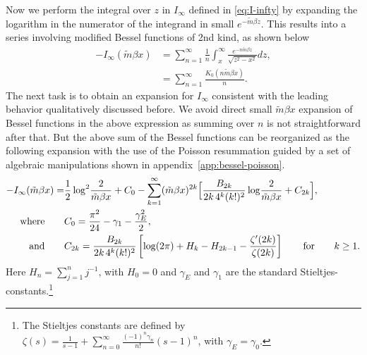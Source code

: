 \documentclass[a4paper,11pt]{article}
\newcommand{\appref}[1]{appendix~\ref{#1}}
\newcommand{\e}{\mathrm e}
\newcommand{\dd}{\mathrm d}
\begin{document}
Now we perform the integral over $z$ in $I_\infty$ defined in \eqref{eq:I-infty} by expanding the logarithm in the numerator of the integrand in small $e^{-\tilde m \beta z}$. This results into a series involving modified Bessel functions of 2nd kind, as shown below 
\begin{align}
	-I_\infty(\tilde m\beta x)
	&=\sum_{n=1}^{\infty} \frac{1}{n} \int_x^\infty \frac{e^{-n\tilde m  \beta z}}{\sqrt{z^2-x^2}} dz
	\nonumber,\\
	&=
	\sum_{n=1}^{\infty}
	\frac{K_0(n\tilde m\beta x)}{n}.
	\label{eq:BP-bessel-sum}
\end{align}
The next task is to obtain an expansion for $I_\infty$ consistent with the leading behavior qualitatively  discussed before.
We avoid direct small $\tilde m \beta x$ expansion of  Bessel functions in the above expression as summing over $n$ is not straightforward after that. But the above sum of the Bessel functions can be reorganized as the following expansion with the use of the Poisson resummation guided by a set of algebraic manipulations shown in \appref{app:bessel-poisson}.
%
%
\begin{align}
	-I_\infty(\tilde m\beta x)=&
 \frac12\log^2\!\frac2{\tilde m\beta x}+C_0
-\sum_{k=1}^{\infty}(\tilde m\beta x)^{2k}
 \Big[
 \frac{B_{2k}}{2k\,4^k(k!)^2}
 \log\!\frac2{\tilde m\beta x}+C_{2k}
 \Big],
\nonumber\\
{\rm where}\qquad &C_0
 =\frac{\pi^2}{24}-\gamma_1-\frac{\gamma_E^2}{2}, \label{eq:I-all-orders}
\\ {\rm and} \qquad
& C_{2k}
 =\frac{B_{2k}}{2k\,4^k(k!)^2}
 \left[
 \log(2\pi)+H_k-H_{2k-1}
 -\frac{\zeta'(2k)}{\zeta(2k)}
 \right] \qquad {\rm for }\qquad k\ge1.
 \nonumber
\end{align}
Here $H_n=\sum_{j=1}^n j^{-1}$, with $H_0=0$ and $\gamma_E$ and $\gamma_1$ are the standard Stieltjes-constants.\footnote{The Stieltjes constants are defined by
	$
	\zeta(s)=\frac1{s-1}
	+\sum_{n=0}^{\infty}\frac{(-1)^n\gamma_n}{n!}(s-1)^n
	$, with $\gamma_E=\gamma_0.$}
\\
\end{document}

